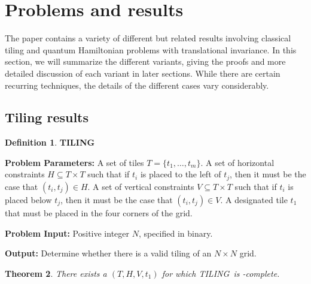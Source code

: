 \documentclass[10pt]{article}
\newtheorem{theorem}{Theorem}[section]
\theoremstyle{definition}
\newtheorem{definition}[theorem]{Definition}
\numberwithin{equation}{section}
\newcommand{\NEXP}{{\sf{NEXP}}}
\newcommand{\tiling}{TILING}
\begin{document}
\section{Problems and results}
\label{sec:results}

The paper contains a variety of different but related results involving classical tiling and
quantum Hamiltonian problems with translational invariance.  In this section, we will
summarize the different variants, giving the proofs and more detailed discussion of
each variant in later sections.  While there are certain recurring techniques, the
details of the different cases vary considerably.

\subsection{Tiling results}

\begin{definition}{\bf \tiling}

\noindent
{\bf Problem Parameters:} A set of tiles $T = \{t_1,\ldots,t_m\}$.
A set of horizontal constraints $H \subseteq T \times T$ such that if
$t_i$ is placed to the left of $t_j$, then it must be the case that
$(t_i,t_j) \in H$. A set of vertical constraints $V \subseteq T \times T$ such that if
$t_i$ is placed below $t_j$, then it must be the case that
$(t_i,t_j) \in V$. A designated tile $t_1$ that must be placed in the four corners of the grid.


\noindent
{\bf Problem Input:} Positive integer $N$, specified in binary.



\noindent
{\bf Output:} Determine whether there is a valid tiling of an $N \times N$ grid.
\end{definition}





\begin{theorem}
\label{th:unweighted-tiling}
There exists a $(T,H,V,t_1)$ for which \tiling\ is \NEXP-complete.
\end{theorem}
\end{document}
